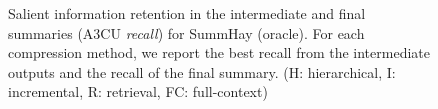 \begin{figure}[t]
    \centering
    \resizebox{0.48\textwidth}{!}{}
    \caption{Salient information retention in the intermediate and final summaries (A3CU \emph{recall}) for SummHay (oracle). For each compression method, we report the best recall from the intermediate outputs and the recall of the final summary. (H: hierarchical, I: incremental, R: retrieval, FC: full-context)}
    \label{fig:inf_loss_summhayoracle}
\end{figure}